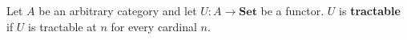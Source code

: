 Let $A$ be an arbitrary category and let $U: A \longrightarrow \mathbf{Set}$ be a functor. $U$ is \textbf{tractable} if $U$ is tractable at $n$ for every cardinal $n$.
